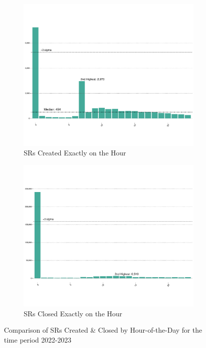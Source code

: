 \documentclass[linenumber]{jdsart}
\begin{document}
\begin{figure}[tbp]
    \centering
    \begin{subfigure}[t]{0.495\textwidth} %
        \centering
        \includegraphics[width=\textwidth]{2-year-trend_SRs_created_on_the_hour.pdf}
        \caption{SRs Created Exactly on the Hour}
        \label{fig:busiestcreated}
    \end{subfigure}
    \hfill %
    \begin{subfigure}[t]{0.495\textwidth} %
        \centering
        \includegraphics[width=\textwidth]{2-year-trend_SRs_closed_on_the_hour.pdf}
        \caption{SRs Closed Exactly on the Hour}
        \label{fig:busiestclosed}
    \end{subfigure}
    \caption{Comparison of SRs Created \& Closed by Hour-of-the-Day for the time period 2022-2023}
    \label{fig:comparison}
\end{figure}
\end{document}
